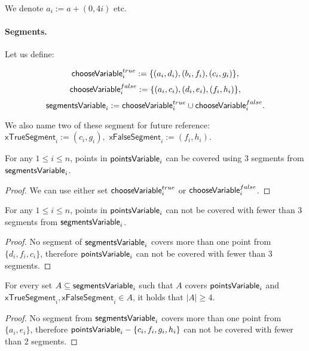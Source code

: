 We denote $a_i := a + (0,4i)$ etc.

\paragraph{Segments.}

\newcommand{\xTrueSegmentDef}[1]{(c_{#1}, g_{#1})}
\newcommand{\xFalseSegmentDef}[1]{(f_{#1}, h_{#1})}
\newcommand{\xTrueSegment}[1]{\mathsf{xTrueSegment}_{#1}}
\newcommand{\xFalseSegment}[1]{\mathsf{xFalseSegment}_{#1}}
\newcommand{\orTrueSegment}[2]{(t_{#1, #2}, v_{#1, #2})}

Let us define:

$$\mathsf{chooseVariable}^{true}_{i} :=\{ (a_i, d_i), (b_i, f_i), (c_i, g_i)\},$$
$$\mathsf{chooseVariable}^{false}_{i} := \{(a_i, c_i), (d_i, e_i), (f_i, h_i)\},$$
$$\mathsf{segmentsVariable}_{i} := \mathsf{chooseVariable}^{true}_{i} \cup \mathsf{chooseVariable}^{false}_{i}.$$

We also name two of these segment for future reference:
$\xTrueSegment{i} := \xTrueSegmentDef{i},$
$\xFalseSegment{i} := \xFalseSegmentDef{i}.$

\begin{lemma}
\label{choose_variables_solution}
For any $1 \le i \le n$, points in $\mathsf{pointsVariable}_{i}$
can be covered using 3 segments from $\mathsf{segmentsVariable}_{i}$.
\end{lemma}

\begin{proof}
We can use either set $\mathsf{chooseVariable}^{true}_{i}$ or $\mathsf{chooseVariable}^{false}_{i}$.
\end{proof}

\begin{lemma}
\label{choose_variables_no_less}
For any $1 \le i \le n$, points in $\mathsf{pointsVariable}_{i}$
can not be covered with fewer than 3 segments from $\mathsf{segmentsVariable}_{i}$.
\end{lemma}

\begin{proof}
No segment of $\mathsf{segmentsVariable}_{i}$ covers more than one point from
$\{d_i, f_i, c_i\}$, therefore $\mathsf{pointsVariable}_{i}$ can
not be covered with fewer than 3 segments.
\end{proof}

\begin{lemma}
\label{choose_variables_both}
For every set $A \subseteq \mathsf{segmentsVariable}_{i}$ such that $A$ covers $\mathsf{pointsVariable}_{i}$
and $\xTrueSegment{i}, \xFalseSegment{i} \in A$,
it holds that $|A| \ge 4$.
\end{lemma}
\begin{proof}
No segment from $\mathsf{segmentsVariable}_{i}$ covers more than one point from
$\{a_i, e_i\}$,
therefore 
$\mathsf{pointsVariable}_{i} - \{c_i, f_i, g_i, h_i\}$
can not be covered with fewer than 2 segments.
\end{proof}


